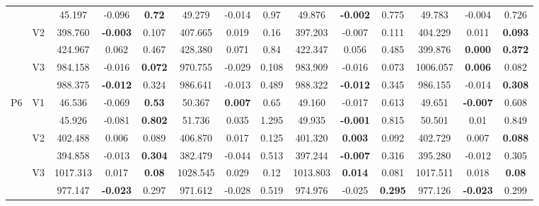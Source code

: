 \documentclass[12pt,a4paper]{article}
\begin{document}
\begin{sidewaystable}[ht]
{\begin{tabular}{cc|ccc|ccc|ccc|ccc|}
   &  & 45.197 & -0.096 & \textbf{0.72} & 49.279 & -0.014 & 0.97 & 49.876 & \textbf{-0.002} & 0.775 & 49.783 & -0.004 & 0.726 \\ 
   & \multirow{2}{*}{V2} & 398.760 & \textbf{-0.003} & 0.107 & 407.665 & 0.019 & 0.16 & 397.203 & -0.007 & 0.111 & 404.229 & 0.011 & \textbf{0.093} \\ 
   &  & 424.967 & 0.062 & 0.467 & 428.380 & 0.071 & 0.84 & 422.347 & 0.056 & 0.485 & 399.876 & \textbf{0.000} & \textbf{0.372} \\ 
   & \multirow{2}{*}{V3} & 984.158 & -0.016 & \textbf{0.072} & 970.755 & -0.029 & 0.108 & 983.909 & -0.016 & 0.073 & 1006.057 & \textbf{0.006} & 0.082 \\ 
   &  & 988.375 & \textbf{-0.012} & 0.324 & 986.641 & -0.013 & 0.489 & 988.322 & \textbf{-0.012} & 0.345 & 986.155 & -0.014 & \textbf{0.308} \\ 
   \hline \hline\multirow{6}{*}{P6} & \multirow{2}{*}{V1} & 46.536 & -0.069 & \textbf{0.53} & 50.367 & \textbf{0.007} & 0.65 & 49.160 & -0.017 & 0.613 & 49.651 & \textbf{-0.007} & 0.608 \\ 
   &  & 45.926 & -0.081 & \textbf{0.802} & 51.736 & 0.035 & 1.295 & 49.935 & \textbf{-0.001} & 0.815 & 50.501 & 0.01 & 0.849 \\ 
   & \multirow{2}{*}{V2} & 402.488 & 0.006 & 0.089 & 406.870 & 0.017 & 0.125 & 401.320 & \textbf{0.003} & 0.092 & 402.729 & 0.007 & \textbf{0.088} \\ 
   &  & 394.858 & -0.013 & \textbf{0.304} & 382.479 & -0.044 & 0.513 & 397.244 & \textbf{-0.007} & 0.316 & 395.280 & -0.012 & 0.305 \\ 
   & \multirow{2}{*}{V3} & 1017.313 & 0.017 & \textbf{0.08} & 1028.545 & 0.029 & 0.12 & 1013.803 & \textbf{0.014} & 0.081 & 1017.511 & 0.018 & \textbf{0.08} \\ 
   &  & 977.147 & \textbf{-0.023} & 0.297 & 971.612 & -0.028 & 0.519 & 974.976 & -0.025 & \textbf{0.295} & 977.126 & \textbf{-0.023} & 0.299 \\ 
   \hline
\end{tabular}
}
\end{sidewaystable}
\end{document}
